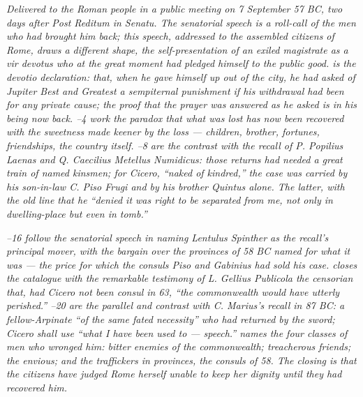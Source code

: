 
\textit{Delivered to the Roman people in a public meeting on
7 September 57 BC, two days after \textit{Post Reditum in
Senatu}. The senatorial speech is a roll-call of the men who
had brought him back; this speech, addressed to the assembled
citizens of Rome, draws a different shape, the
self-presentation of an exiled magistrate as a
\textit{vir devotus} who at the great moment had pledged
himself to the public good.  is the
\textit{devotio} declaration: that, when he gave himself up
out of the city, he had asked of Jupiter Best and Greatest a
sempiternal punishment if his withdrawal had been for any
private cause; the proof that the prayer was answered as he
asked is in his being now back. --4 work the
paradox that what was lost has now been recovered with the
sweetness made keener by the loss --- children, brother,
fortunes, friendships, the country itself. --8
are the contrast with the recall of P. Popilius Laenas and
Q. Caecilius Metellus Numidicus: those returns had needed a
great train of named kinsmen; for Cicero, ``naked of
kindred,'' the case was carried by his son-in-law C. Piso
Frugi and by his brother Quintus alone. The latter, with the
old line that he ``denied it was right to be separated from
me, not only in dwelling-place but even in tomb.''}

\textit{--16 follow the senatorial speech in
naming Lentulus Spinther as the recall's principal mover, with
the bargain over the provinces of 58 BC named for what it was
--- the price for which the consuls Piso and Gabinius had
sold his case.  closes the catalogue with the
remarkable testimony of L. Gellius Publicola the censorian
that, had Cicero not been consul in 63, ``the commonwealth
would have utterly perished.'' --20 are the
parallel and contrast with C. Marius's recall in 87 BC: a
fellow-Arpinate ``of the same fated necessity'' who had
returned by the sword; Cicero shall use ``what I have been
used to --- speech.''  names the four classes
of men who wronged him: bitter enemies of the commonwealth;
treacherous friends; the envious; and the traffickers in
provinces, the consuls of 58. The closing  is
that the citizens have judged Rome herself unable to keep her
dignity until they had recovered him.}
